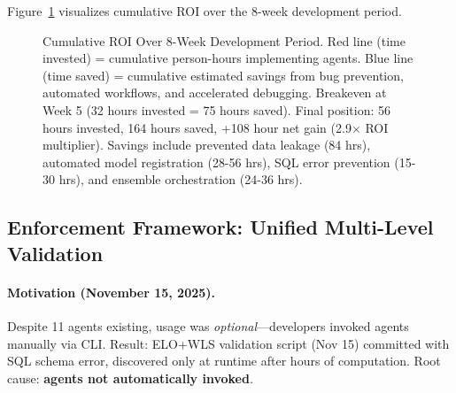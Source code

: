 Figure~\ref{fig:cumulative-roi} visualizes cumulative ROI over the 8-week development period.

\begin{figure}[htbp]
\centering
{}
\caption{Cumulative ROI Over 8-Week Development Period. Red line (time invested) = cumulative person-hours implementing agents. Blue line (time saved) = cumulative estimated savings from bug prevention, automated workflows, and accelerated debugging. Breakeven at Week 5 (32 hours invested = 75 hours saved). Final position: 56 hours invested, 164 hours saved, +108 hour net gain (2.9$\times$ ROI multiplier). Savings include prevented data leakage (84 hrs), automated model registration (28-56 hrs), SQL error prevention (15-30 hrs), and ensemble orchestration (24-36 hrs).}
\label{fig:cumulative-roi}
\end{figure}

\subsection{Enforcement Framework: Unified Multi-Level Validation}

\paragraph{Motivation (November 15, 2025).}
Despite 11 agents existing, usage was \textit{optional}---developers invoked agents manually via CLI. Result: ELO+WLS validation script (Nov 15) committed with SQL schema error, discovered only at runtime after hours of computation. Root cause: \textbf{agents not automatically invoked}.

